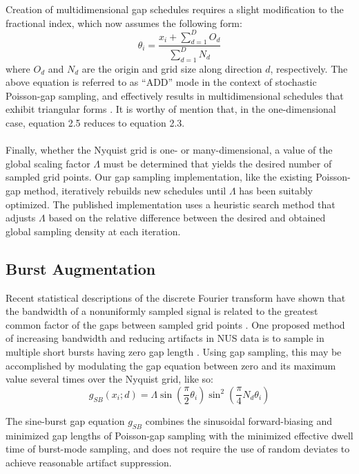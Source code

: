 \begin{doublespace}
Creation of multidimensional gap schedules requires a slight modification to
the fractional index, which now assumes the following form:
\begin{equation}
\theta_i = \frac{x_i + \sum_{d=1}^D O_d}{\sum_{d=1}^D N_d}
\end{equation}
where $O_d$ and $N_d$ are the origin and grid size along direction $d$,
respectively. The above equation is referred to as ``ADD'' mode in the context
of stochastic Poisson-gap sampling, and effectively results in multidimensional
schedules that exhibit triangular forms \cite{hyberts:jmr2014}. It is worthy of
mention that, in the one-dimensional case, equation 2.5 reduces to equation
2.3.
\\\\
Finally, whether the Nyquist grid is one- or many-dimensional, a value of the
global scaling factor $\Lambda$ must be determined that yields the desired
number of sampled grid points. Our gap sampling implementation, like the
existing Poisson-gap method, iteratively rebuilds new schedules until
$\Lambda$ has been suitably optimized. The published implementation uses a
heuristic search method that adjusts $\Lambda$ based on the relative difference
between the desired and obtained global sampling density at each iteration.
\end{doublespace}

\subsection{Burst Augmentation}

\begin{doublespace}
Recent statistical descriptions of the discrete Fourier transform have shown
that the bandwidth of a nonuniformly sampled signal is related to the greatest
common factor of the gaps between sampled grid points
\cite{bretthorst:cmr2008}. One proposed method of increasing bandwidth and
reducing artifacts in NUS data is to sample in multiple short bursts having
zero gap length \cite{maciejewski:jmr2009}. Using gap sampling, this may be
accomplished by modulating the gap equation between zero and its maximum value
several times over the Nyquist grid, like so:
\begin{equation}
g_{SB}(x_i; d) = \Lambda
 \sin \left( \frac{\pi}{2} \theta_i \right)
 \sin^2 \left( \frac{\pi}{4} N_d \theta_i \right)
\end{equation}

The sine-burst gap equation $g_{SB}$ combines the sinusoidal forward-biasing
and minimized gap lengths of Poisson-gap sampling with the minimized effective
dwell time of burst-mode sampling, and does not require the use of random
deviates to achieve reasonable artifact suppression.
\end{doublespace}

